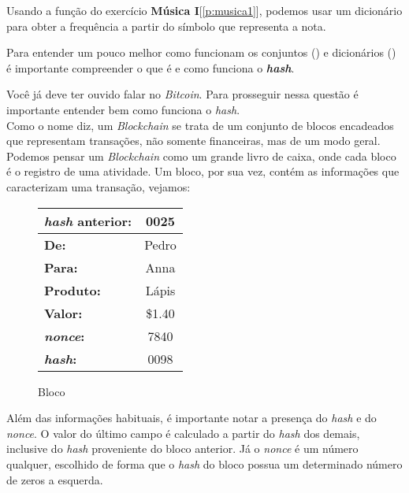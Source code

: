 \documentclass[12pt]{article}
\begin{document}
	Usando a função do exercício \textbf{Música I}[\ref{p:musica1}], podemos usar um dicionário para obter a frequência a partir do símbolo que representa a nota.


	\begin{interlude}{ \incomplete \label{i:hash}}
		
	Para entender um pouco melhor como funcionam os conjuntos () e dicionários () é importante compreender o que é e como funciona o \textit{\textbf{hash}}.
	
	
	
	\end{interlude}	
	
	\label{p:blockchain}
	
	Você já deve ter ouvido falar no \textit{Bitcoin}. Para prosseguir nessa questão é importante entender bem como funciona o \textit{hash}.\\
	
	Como o nome diz, um \textit{Blockchain} se trata de um conjunto de blocos encadeados que representam transações, não somente financeiras, mas de um modo geral. Podemos pensar um \textit{Blockchain} como um grande livro de caixa, onde cada bloco é o registro de uma atividade. Um bloco, por sua vez, contém as informações que caracterizam uma transação, vejamos:
	
	\begin{figure}[H]
		\centering
		\begin{tabular}{|lc|}
		\hline
		\textbf{\textit{hash} anterior:} & 0025\\
		\hline
		\textbf{De:} & Pedro \\
		\hline
		\textbf{Para:} & Anna \\
		\hline
		\textbf{Produto:} & Lápis \\
		\hline	
		\textbf{Valor:} & \$1.40 \\
		\hline
		\textbf{\textit{nonce}:} & 7840 \\
		\hline
		\textbf{\textit{hash}:} & 0098  \\
		\hline
		\end{tabular}
		\label{fig:blockchain}
		\caption{Bloco}
	\end{figure}
	
	Além das informações habituais, é importante notar a presença do \textit{hash} e do \textit{nonce}. O valor do último campo é calculado a partir do \textit{hash} dos demais, inclusive do \textit{hash} proveniente do bloco anterior. Já o \textit{nonce} é um número qualquer, escolhido de forma que o \textit{hash} do bloco possua um determinado número de zeros a esquerda.\\
	
\end{document}
